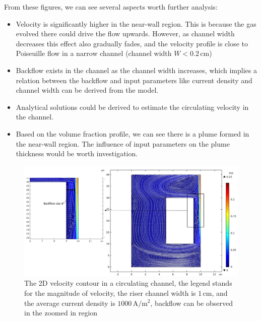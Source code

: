 From these figures, we can see several aspects worth further analysis:

\begin{itemize}
    \item Velocity is significantly higher in the near-wall region. This is because the gas evolved there could drive the flow upwards. However, as channel width decreases this effect also gradually fades, and the velocity profile is close to Poiseuille flow in a narrow channel (channel width $W < 0.2 \, \mathrm{cm}$)
    \item Backflow exists in the channel as the channel width increases, which implies a relation between the backflow and input parameters like current density and channel width can be derived from the model.
    \item Analytical solutions could be derived to estimate the circulating velocity in the channel.
    \item Based on the volume fraction profile, we can see there is a plume formed in the near-wall region. The influence of input parameters on the plume thickness would be worth investigation.
\end{itemize}



 \begin{figure}[H]
     \centering
     \includegraphics[scale=0.6]{velocitycontour.png}
     \caption{The 2D velocity contour in a circulating channel, the legend stands for the magnitude of velocity, the riser channel width is $1 \, \mathrm{cm}$, and the average current density is $1000 \, \mathrm{A/m^2}$, backflow can be observed in the zoomed in region}
     \label{velocitycontour}
 \end{figure}
 
